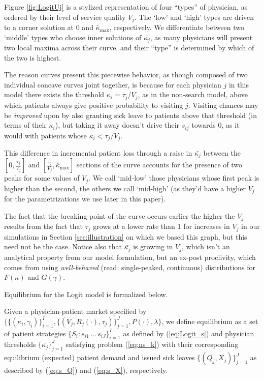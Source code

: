 \documentclass[../main.tex]{subfiles}
\begin{document}
Figure \ref{fig:LogitUj} is a stylized representation of four ``types'' of physician, as ordered by their level of service quality $V_j$. The `low' and `high' types are driven to a corner solution at 0 and $\bar{\kappa}_{\max}$, respectively. We differentiate between two `middle' types who choose inner solutions of $\bar{\kappa_j}$, as many physicians will present two local maxima across their curve, and their ``type'' is determined by which of the two is highest.

The reason curves present this piecewise behavior, as though composed of two individual concave curves joint together, is because for each physician $j$ in this model there exists the threshold $\kappa_i = \tau_j/V_j$, as in the non-search model, above which patients always give positive probability to visiting $j$. Visiting chances may be \textit{improved} upon by also granting sick leave to patients above that threshold (in terms of their $\kappa_i$), but taking it away doesn't drive their $s_{ij}$ towards 0, as it would with patients whose $\kappa_i < \tau_j/V_j$.

This difference in incremental patient loss through a raise in $\bar{\kappa_j}$ between the $[0,\frac{\tau_j}{V_j}]$ and $[\frac{\tau_j}{V_j},\bar{\kappa}_{\max}]$ sections of the curve accounts for the presence of two peaks for some values of $V_j$. We call `mid-low' those physicians whose first peak is higher than the second, the others we call `mid-high' (as they'd have a higher $V_j$ for the parametrizations we use later in this paper).

The fact that the breaking point of the curve occurs earlier the higher the $V_j$ results from the fact that $\tau_j$ grows at a lower rate than 1 for increases in $V_j$ in our simulations in Section \ref{sec:illustration} on which we based this graph, but this need not be the case. Notice also that $\bar{\kappa_j}$ is growing in $V_j$, which isn't an analytical property from our model formulation, but an ex-post proclivity, which comes from using \textit{well-behaved} (read: single-peaked, continuous) distributions for $F(\kappa)$ and $G(\gamma)$.

Equilibrium for the Logit model is formalized below.


\begin{equilibrium}
    \label{Logit_eq}
Given a physician-patient market specified by $\{\{(\kappa_i,\gamma_i)\}_{i =1}^{I},\{(V_j, R_j(\cdot), \tau_j)\}_{j =1}^{J}, P(\cdot), \lambda \}$, we define equilibrium as a set of patient strategies $\{S_i: s_{i1} \, ... \, s_{iJ}\}_{i =1}^{I}$ as defined by (\ref{eq:Logit_s}) and physician thresholds $\{\bar{\kappa_j}\}_{j =1}^{J}$ satisfying problem (\ref{eq:ns_k}) with their corresponding equilibrium (expected) patient demand and issued sick leaves $\{(Q_j,X_j)\}_{j =1}^{J}$ as described by (\ref{eq:s_Q}) and (\ref{eq:s_X}), respectively.
\end{equilibrium}
\end{document}
